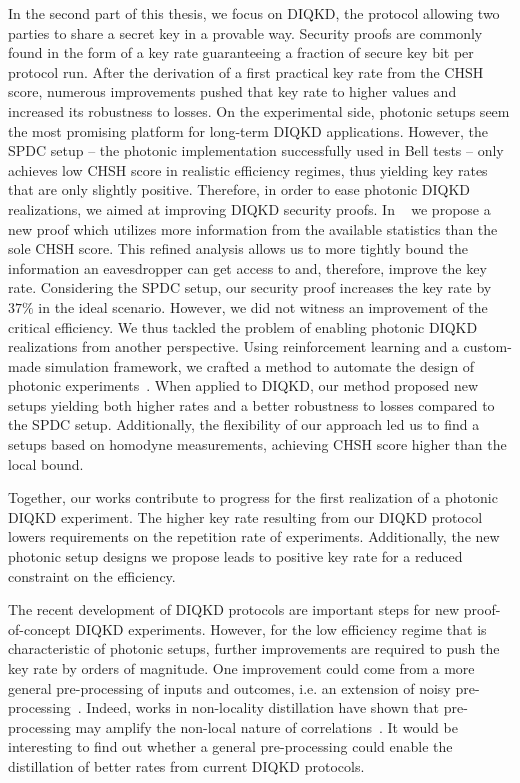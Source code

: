In the second part of this thesis, we focus on \acrfull{DIQKD}, the protocol allowing two parties to share a secret key in a provable way.
Security proofs are commonly found in the form of a key rate guaranteeing a fraction of secure key bit per protocol run.
After the derivation of a first practical key rate from the CHSH score, numerous improvements pushed that key rate to higher values and increased its robustness to losses.
On the experimental side, photonic setups seem the most promising platform for long-term DIQKD applications.
However, the SPDC setup -- the photonic implementation successfully used in Bell tests -- only achieves low CHSH score in realistic efficiency regimes, thus yielding key rates that are only slightly positive.
Therefore, in order to ease photonic DIQKD realizations, we aimed at improving DIQKD security proofs.
In ~\cite{Sekatski2021} we propose a new proof which utilizes more information from the available statistics than the sole CHSH score.
This refined analysis allows us to more tightly bound the information an eavesdropper can get access to and, therefore, improve the key rate.
Considering the SPDC setup, our security proof increases the key rate by $37\%$ in the ideal scenario.
However, we did not witness an improvement of the critical efficiency.
We thus tackled the problem of enabling photonic DIQKD realizations from another perspective.
Using reinforcement learning and a custom-made simulation framework, we crafted a method to automate the design of photonic experiments~\cite{Valcarce2022b}.
When applied to DIQKD, our method proposed new setups yielding both higher rates and a better robustness to losses compared to the SPDC setup.
Additionally, the flexibility of our approach led us to find a setups based on homodyne measurements, achieving CHSH score higher than the local bound.

Together, our works contribute to progress for the first realization of a photonic DIQKD experiment.
The higher key rate resulting from our DIQKD protocol lowers requirements on the repetition rate of experiments.
Additionally, the new photonic setup designs we propose leads to positive key rate for a reduced constraint on the efficiency.

\medbreak

The recent development of DIQKD protocols are important steps for new proof-of-concept DIQKD experiments.
However, for the low efficiency regime that is characteristic of photonic setups, further improvements are required to push the key rate by orders of magnitude.
One improvement could come from a more general pre-processing of inputs and outcomes, i.e. an extension of noisy pre-processing~\cite{Ho2020}.
Indeed, works in non-locality distillation have shown that pre-processing may amplify the non-local nature of correlations~\cite{Forster2009}.
It would be interesting to find out whether a general pre-processing could enable the distillation of better rates from current DIQKD protocols.

